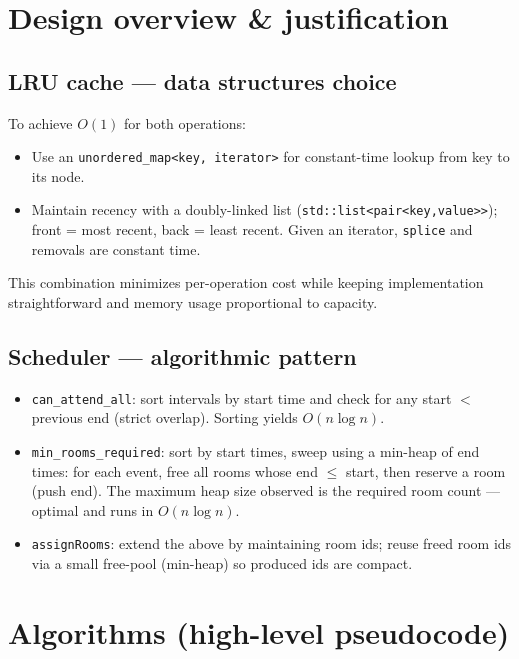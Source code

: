 \documentclass[11pt,a4paper]{article}
\begin{document}
\section{Design overview \& justification}
\subsection{LRU cache — data structures choice}
To achieve \(O(1)\) for both operations:
\begin{itemize}
  \item Use an \texttt{unordered\_map<key, iterator>} for constant-time lookup from key to its node.
  \item Maintain recency with a doubly-linked list (\texttt{std::list<pair<key,value>>}); front = most recent, back = least recent. Given an iterator, \texttt{splice} and removals are constant time.
\end{itemize}
This combination minimizes per-operation cost while keeping implementation straightforward and memory usage proportional to capacity.

\subsection{Scheduler — algorithmic pattern}
\begin{itemize}
  \item \texttt{can\_attend\_all}: sort intervals by start time and check for any start $<$ previous end (strict overlap). Sorting yields \(O(n\log n)\).
  \item \texttt{min\_rooms\_required}: sort by start times, sweep using a min-heap of end times: for each event, free all rooms whose end $\le$ start, then reserve a room (push end). The maximum heap size observed is the required room count — optimal and runs in \(O(n\log n)\).
  \item \texttt{assignRooms}: extend the above by maintaining room ids; reuse freed room ids via a small free-pool (min-heap) so produced ids are compact.
\end{itemize}

\section{Algorithms (high-level pseudocode)}
\end{document}
